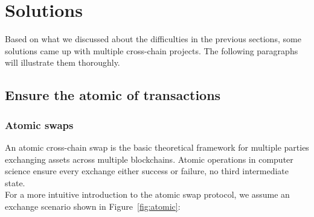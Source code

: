 \section{Solutions}
\label{sec:sol}
\noindent Based on what we discussed about the difficulties in the previous sections, some solutions came up with multiple cross-chain projects. The following paragraphs will illustrate them thoroughly.
\subsection{Ensure the atomic of transactions}

\subsubsection{Atomic swaps}
\noindent An atomic cross-chain swap\cite{herlihy2018atomic} is the basic theoretical framework for multiple parties exchanging assets across multiple blockchains. Atomic operations in computer science ensure every exchange either success or failure, no third intermediate state.\\
\noindent For a more intuitive introduction to the atomic swap protocol, we assume an exchange scenario shown in Figure~\ref{fig:atomic}:

